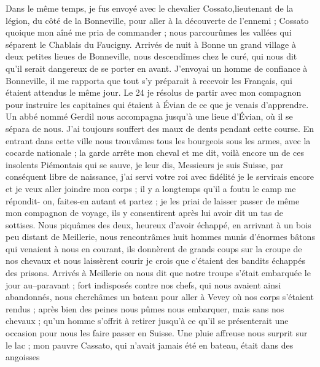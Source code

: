 \documentclass[12pt]{article}
\begin{document}
 Dans le même temps, je fus envoyé avec le chevalier
Cossato,lieutenant de la légion, du côté de la Bonneville, pour aller à la découverte de l’ennemi ;
Cossato quoique mon aîné me pria de commander ; nous parcourûmes les vallées qui séparent le
Chablais du Faucigny. Arrivés de nuit à Bonne un grand village à deux petites lieues de Bonneville,
nous descendîmes chez le curé, qui nous dit qu’il serait dangereux de se porter en avant. J’envoyai
un homme de confiance à Bonneville, il me rapporta que tout s’y préparait à recevoir les Français,
qui étaient attendus le même jour. Le 24 je résolus de partir avec mon compagnon pour instruire les
capitaines qui étaient à Évian de ce que je venais d’apprendre. Un abbé nommé Gerdil nous accompagna
jusqu’à une lieue d’Évian, où il se sépara de nous. J’ai toujours souffert des maux de dents pendant
cette course. En entrant dans cette ville nous trouvâmes tous les bourgeois sous les armes, avec la
cocarde nationale ; la garde arrête mon cheval et me dit, voilà encore un de ces insolents
Piémontais qui se sauve, je leur dis, Messieurs je suis Suisse, par conséquent libre de naissance,
j’ai servi votre roi avec fidélité je le servirais encore et je veux aller joindre mon corps ; il y
a longtemps qu’il a foutu le camp me répondit- on, faites-en autant et partez ; je les priai de
laisser passer de même mon compagnon de voyage, ils y consentirent après lui avoir dit un tas de
sottises. Nous piquâmes des deux, heureux d’avoir échappé, en arrivant à un bois peu distant de
Meillerie, nous rencontrâmes huit hommes munis d’énormes bâtons qui venaient à nous en courant, ils
donnèrent de grands coups sur la croupe de nos chevaux et nous laissèrent courir je crois que
c’étaient des bandits échappés des prisons. Arrivés à Meillerie on nous dit que notre troupe s’était
embarquée le jour au–paravant ; fort indisposés contre nos chefs, qui nous avaient ainsi abandonnés,
nous cherchâmes un bateau pour aller à Vevey où nos corps s’étaient rendus ; après bien des peines
nous pûmes nous embarquer, mais sans nos chevaux ; qu’un homme s’offrit à retirer jusqu’à ce qu’il
se présenterait une occasion pour nous les faire passer en Suisse. Une pluie affreuse nous surprit
sur le lac ; mon pauvre Cassato, qui n’avait jamais été en bateau, était dans des angoisses
\end{document}
